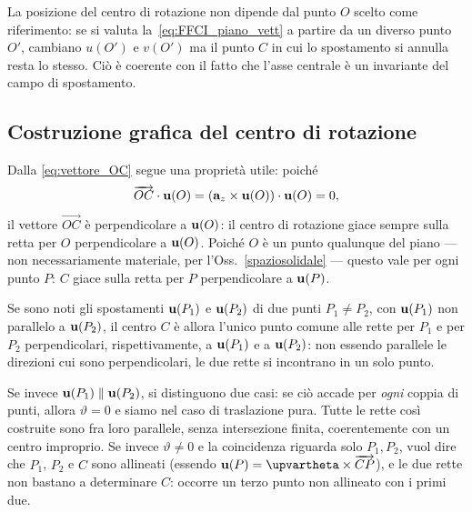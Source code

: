 



\begin{oss}
	La posizione del centro di rotazione non dipende dal punto
	$O$ scelto come riferimento: se si valuta
	la~\eqref{eq:FFCI_piano_vett} a partire da un diverso punto
	$O'$, cambiano $u(O')$ e $v(O')$ ma il punto $C$ in cui lo
	spostamento si annulla resta lo stesso. Ciò è coerente con
	il fatto che l'asse centrale è un invariante del campo di
	spostamento.
\end{oss}

\subsection{Costruzione grafica del centro di rotazione}\label{CR_graf}
Dalla \eqref{eq:vettore_OC} segue una proprietà utile: poiché
\begin{equation}
\overrightarrow{OC}	\cdot\mathbf{u}(O)=(\mathbf{a}_z\times\mathbf{u}(O))\cdot\mathbf{u}(O) = 0,
\end{equation}
il vettore $\overrightarrow{OC}$ è
perpendicolare a $\mathbf{u}(O)$: il centro di rotazione giace sempre sulla retta
per $O$ perpendicolare a $\mathbf{u}(O)$. Poiché $O$ è un punto qualunque del
piano --- non necessariamente materiale, per l'Oss.~\ref{spaziosolidale}
--- questo vale per ogni punto $P$: $C$ giace sulla retta per $P$
perpendicolare a $\mathbf{u}(P)$.

Se sono noti gli spostamenti $\mathbf{u}(P_1)$ e $\mathbf{u}(P_2)$ di due punti
$P_1\neq P_2$, con $\mathbf{u}(P_1)$ non parallelo a $\mathbf{u}(P_2)$, il centro $C$ è
allora l'unico punto comune alle rette per $P_1$ e per $P_2$
perpendicolari, rispettivamente, a $\mathbf{u}(P_1)$ e a $\mathbf{u}(P_2)$: non essendo
parallele le direzioni cui sono perpendicolari, le due rette si incontrano
in un solo punto.






Se invece $\mathbf{u}(P_1)\parallel\mathbf{u}(P_2)$, si distinguono due casi: se ciò
accade per \emph{ogni} coppia di punti, allora $\vartheta=0$ e siamo nel caso di traslazione pura.
Tutte le rette così costruite
sono fra loro parallele, senza intersezione finita, coerentemente con un
centro improprio. Se invece $\vartheta\neq0$ e la coincidenza riguarda
solo $P_1,P_2$, vuol dire che $P_1$, $P_2$ e $C$ sono allineati (essendo
$\ub(P)=\bm\upvartheta\times\overrightarrow{CP}$), e le due rette non
bastano a determinare $C$: occorre un terzo punto non allineato con i
primi due.

